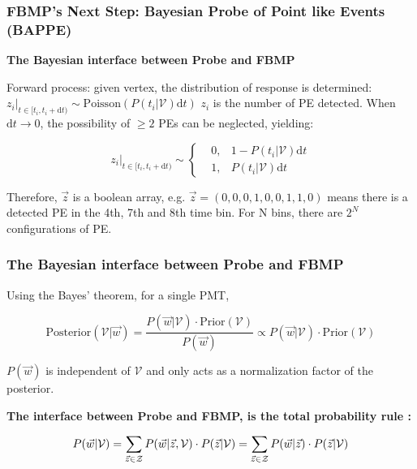 \documentclass{beamer}
\newcommand{\dd}{\mathrm{d}}
\begin{document}
\begin{frame}
    \frametitle{FBMP's Next Step: Bayesian Probe of Point like Events (BAPPE)}
    \textbf{The Bayesian interface between Probe and FBMP}

    Forward process: given vertex, the distribution of response is determined: $z_i|_{t\in[t_i,t_i+\dd t)} \sim \mathrm{Poisson}(P(t_i|\mathcal{V}) \dd t)$ $z_i$ is the number of PE detected. When $\dd t \rightarrow 0$, the possibility of $\geqslant 2$ PEs can be neglected, yielding:

    \begin{equation}
        z_i|_{t\in[t_i,t_i+\dd t)} \sim \left\{ 
            \begin{aligned}
                & 0, & 1-P(t_i|\mathcal{V}) \dd t \\
                & 1, & P(t_i|\mathcal{V}) \dd t
            \end{aligned}
        \right.
        \label{eq:1}
    \end{equation}

    Therefore, $\vec{z}$ is a boolean array, e.g. $\vec{z} = (0,0,0,1,0,0,1,1,0)$ means there is a detected PE in the 4th, 7th and 8th time bin. For N bins, there are $2^N$ configurations of PE.
\end{frame}

\begin{frame}
    \frametitle{The Bayesian interface between Probe and FBMP}

    Using the Bayes' theorem, for a single PMT, 

    \begin{equation}
        \mathrm{Posterior}(\mathcal{V}|\vec{w}) = \frac{P(\vec{w}|\mathcal{V}) \cdot \mathrm{Prior}(\mathcal{V})}  {P(\vec{w})} \propto P(\vec{w}|\mathcal{V}) \cdot \mathrm{Prior}(\mathcal{V})
        \label{eq:2}
    \end{equation}
    
   $P(\vec{w})$ is independent of $\mathcal{V}$ and only acts as a normalization factor of the posterior.

   \textbf{The interface between Probe and FBMP, is {\color{red} the total probability rule} :}

    \begin{equation}
        \small
        P(\vec{w}|\mathcal{V}) = \sum_{\vec{z} \in \mathcal{Z}} P(\vec{w}|\vec{z},\mathcal{V}) \cdot P(\vec{z}|\mathcal{V}) = \sum_{\vec{z} \in \mathcal{Z}} P(\vec{w}|\vec{z}) \cdot P(\vec{z}|\mathcal{V})
        \label{eq:3}
    \end{equation}
\end{frame}
\end{document}
